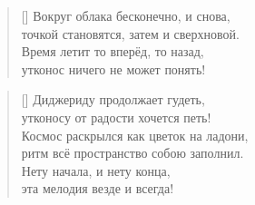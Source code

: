 \documentclass[a5paper,11pt]{memoir}
\begin{document}
\newpage

\begin{verse}[\versewidth]
\hspace{-3cm}Вокруг облака бесконечно, и снова,\\
\hspace{-3cm}точкой становятся, затем и сверхновой.\\
\hspace{-3cm}Время летит то вперёд, то назад,\\
\hspace{-3cm}утконос ничего не может понять!
\end{verse}

\BgThispage


\vspace{11cm}
\begin{verse}[\versewidth]
\hspace{1cm}Диджериду продолжает гудеть,\\
\hspace{1cm}утконосу от радости хочется петь!\\
\hspace{1cm}Космос раскрылся как цветок на ладони,\\
\hspace{1cm}ритм всё пространство собою заполнил.\\
\hspace{1cm}Нету начала, и нету конца,\\
\hspace{1cm}эта мелодия везде и всегда!
\end{verse}
\newpage
\end{document}

